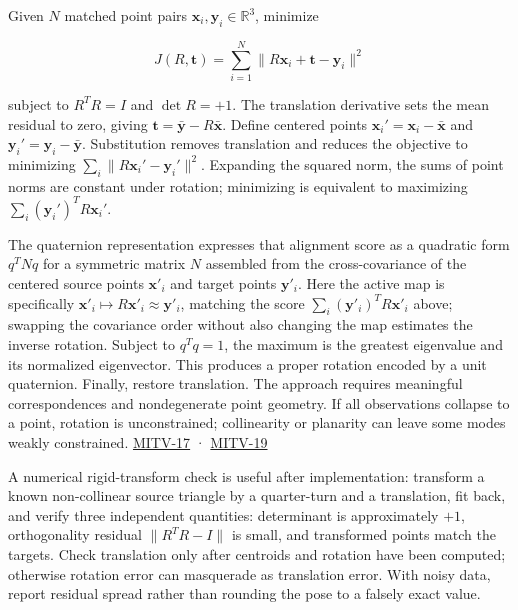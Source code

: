 Given \(N\) matched point pairs \(\mathbf x_i,\mathbf y_i\in\mathbb R^3\), minimize

\[
J(R,\mathbf t)=\sum_{i=1}^N\|R\mathbf x_i+\mathbf t-\mathbf y_i\|^2
\]

subject to \(R^TR=I\) and \(\det R=+1\). The translation derivative sets the mean residual to zero, giving \(\mathbf t=\bar{\mathbf y}-R\bar{\mathbf x}\). Define centered points \(\mathbf x_i'=\mathbf x_i-\bar{\mathbf x}\) and \(\mathbf y_i'=\mathbf y_i-\bar{\mathbf y}\). Substitution removes translation and reduces the objective to minimizing \(\sum_i\|R\mathbf x_i'-\mathbf y_i'\|^2\). Expanding the squared norm, the sums of point norms are constant under rotation; minimizing is equivalent to maximizing \(\sum_i(\mathbf y_i')^TR\mathbf x_i'\).

The quaternion representation expresses that alignment score as a quadratic form \(q^TNq\) for a symmetric matrix \(N\) assembled from the cross-covariance of the centered source points \(\mathbf x'_i\) and target points \(\mathbf y'_i\). Here the active map is specifically \(\mathbf x'_i\mapsto R\mathbf x'_i\approx\mathbf y'_i\), matching the score \(\sum_i(\mathbf y'_i)^TR\mathbf x'_i\) above; swapping the covariance order without also changing the map estimates the inverse rotation. Subject to \(q^Tq=1\), the maximum is the greatest eigenvalue and its normalized eigenvector. This produces a proper rotation encoded by a unit quaternion. Finally, restore translation. The approach requires meaningful correspondences and nondegenerate point geometry. If all observations collapse to a point, rotation is unconstrained; collinearity or planarity can leave some modes weakly constrained. \hyperref[04-visual-computing-ii-ch036-mitv-17---photogrammetry-orientation-axes-of-inertia-symmetry-orientation]{MITV-17} · \hyperref[04-visual-computing-ii-ch036-mitv-19---absolute-orientation-in-closed-form-outliers-and-robustness-ransac]{MITV-19}

A numerical rigid-transform check is useful after implementation: transform a known non-collinear source triangle by a quarter-turn and a translation, fit back, and verify three independent quantities: determinant is approximately \(+1\), orthogonality residual \(\|R^TR-I\|\) is small, and transformed points match the targets. Check translation only after centroids and rotation have been computed; otherwise rotation error can masquerade as translation error. With noisy data, report residual spread rather than rounding the pose to a falsely exact value.

